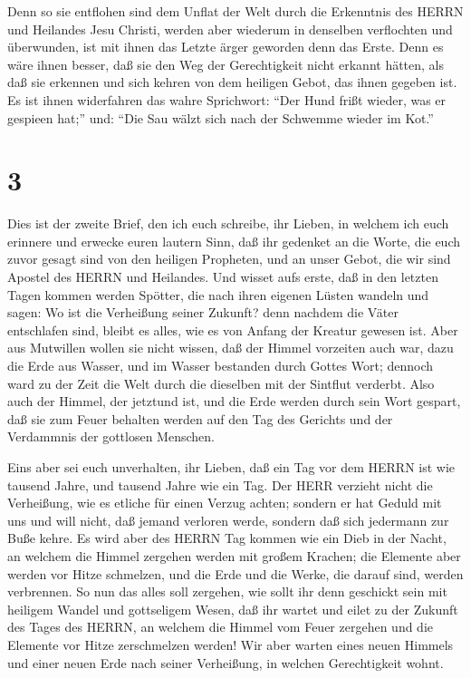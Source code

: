  Denn so sie entflohen sind dem Unflat der Welt durch die
Erkenntnis des HERRN und Heilandes Jesu Christi, werden aber wiederum in
denselben verflochten und überwunden, ist mit ihnen das Letzte ärger
geworden denn das Erste.  Denn es wäre ihnen besser, daß
sie den Weg der Gerechtigkeit nicht erkannt hätten, als daß sie erkennen
und sich kehren von dem heiligen Gebot, das ihnen gegeben ist.
 Es ist ihnen widerfahren das wahre Sprichwort: ``Der Hund
frißt wieder, was er gespieen hat;'' und: ``Die Sau wälzt sich nach der
Schwemme wieder im Kot.''

\hypertarget{section-2}{%
\section{3}\label{section-2}}

 Dies ist der zweite Brief, den ich euch schreibe, ihr
Lieben, in welchem ich euch erinnere und erwecke euren lautern Sinn,
 daß ihr gedenket an die Worte, die euch zuvor gesagt sind
von den heiligen Propheten, und an unser Gebot, die wir sind Apostel des
HERRN und Heilandes.  Und wisset aufs erste, daß in den
letzten Tagen kommen werden Spötter, die nach ihren eigenen Lüsten
wandeln  und sagen: Wo ist die Verheißung seiner Zukunft?
denn nachdem die Väter entschlafen sind, bleibt es alles, wie es von
Anfang der Kreatur gewesen ist.  Aber aus Mutwillen wollen
sie nicht wissen, daß der Himmel vorzeiten auch war, dazu die Erde aus
Wasser, und im Wasser bestanden durch Gottes Wort;  dennoch
ward zu der Zeit die Welt durch die dieselben mit der Sintflut verderbt.
 Also auch der Himmel, der jetztund ist, und die Erde werden
durch sein Wort gespart, daß sie zum Feuer behalten werden auf den Tag
des Gerichts und der Verdammnis der gottlosen Menschen.

 Eins aber sei euch unverhalten, ihr Lieben, daß ein Tag vor
dem HERRN ist wie tausend Jahre, und tausend Jahre wie ein Tag.
 Der HERR verzieht nicht die Verheißung, wie es etliche für
einen Verzug achten; sondern er hat Geduld mit uns und will nicht, daß
jemand verloren werde, sondern daß sich jedermann zur Buße kehre.
 Es wird aber des HERRN Tag kommen wie ein Dieb in der
Nacht, an welchem die Himmel zergehen werden mit großem Krachen; die
Elemente aber werden vor Hitze schmelzen, und die Erde und die Werke,
die darauf sind, werden verbrennen.  So nun das alles soll
zergehen, wie sollt ihr denn geschickt sein mit heiligem Wandel und
gottseligem Wesen,  daß ihr wartet und eilet zu der Zukunft
des Tages des HERRN, an welchem die Himmel vom Feuer zergehen und die
Elemente vor Hitze zerschmelzen werden!  Wir aber warten
eines neuen Himmels und einer neuen Erde nach seiner Verheißung, in
welchen Gerechtigkeit wohnt.

